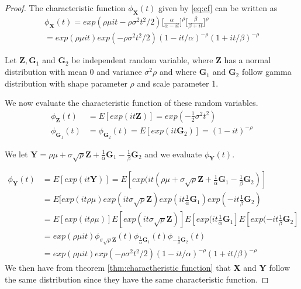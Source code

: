 \documentclass[12pt,travaildirige,nobabel, twoside]{dms}
\numberwithin{equation}{section}
\numberwithin{table}{chapter}
\numberwithin{figure}{chapter}
\begin{document}
\begin{proof}

	The characteristic function $\phi_\textbf{X}(t)$ given by \eqref{eq:cf} can be written as 
	\begin{equation}\begin{split}
	\phi_\textbf{X}(t)=exp(\rho\mu i t-\rho\sigma^2 t^2/2)\bigg[\frac{\alpha}{\alpha-it}\bigg]^\rho \bigg[\frac{\beta}{\beta +it}\bigg]^\rho\\  =exp(\rho\mu it)exp(-\rho\sigma^2 t^2/2)(1-it/\alpha)^{-\rho}(1+it/\beta)^{-\rho}\end{split}\end{equation}
	
	Let $\textbf{Z},\textbf{G}_1$ and $\textbf{G}_2$ be independent random variable, where \textbf{Z} has a normal distribution with mean 0 and variance $\sigma^2\rho$ and where $\textbf{G}_1 $ and $\textbf{G}_2$ follow gamma distribution with shape parameter $\rho$ and scale parameter 1.
	
	We now evaluate the characteristic function of these random variables.
	\begin{equation}
	\begin{aligned}
	\phi_{\textbf{Z}}(t)&=E[exp(it\textbf{Z})]=exp(-\frac{1}{2}\sigma^2t^2)\\
	\phi_{\textbf{G}_1}(t)&=\phi_{\textbf{G}_2}(t)=E[exp(it\textbf{G}_2)]=(1-it)^{-\rho}	
	\end{aligned}
	\end{equation}

	We let $ \textbf{Y}{=}\rho\mu + \sigma\sqrt{\rho}\textbf{Z}+\frac{1}{\alpha}\textbf{G}_1-\frac{1}{\beta}\textbf{G}_2 $ and we evaluate $\phi_\textbf{Y}(t)$.
	

	\begin{equation}
	\begin{aligned}
		\phi_\textbf{Y}(t)&=E[exp(it\textbf{Y})]=E[exp(it(\rho\mu + \sigma\sqrt{\rho}\textbf{Z}+\frac{1}{\alpha}\textbf{G}_1-\frac{1}{\beta}\textbf{G}_2)]\\
		&=E[exp(it\rho\mu)exp(it\sigma\sqrt{\rho}\textbf{Z})exp(it\frac{1}{\alpha}\textbf{G}_1)exp(-it\frac{1}{\beta}\textbf{G}_2)\\
		&=E[exp(it\rho\mu)]E[exp(it\sigma\sqrt{\rho}\textbf{Z})]E[exp(it\frac{1}{\alpha}\textbf{G}_1]E[exp(-it\frac{1}{\beta}\textbf{G}_2]\\
		&=exp(\rho\mu it)\phi_{\sigma\sqrt{\rho}\textbf{Z}}(t)\phi_{\frac{1}{\alpha}\textbf{G}_1}(t)\phi_{-\frac{1}{\beta}\textbf{G}_2}(t)\\
		&=exp(\rho\mu it)exp(-\rho\sigma^2 t^2/2)(1-it/\alpha)^{-\rho}(1+it/\beta)^{-\rho}
		\end{aligned}
	\end{equation}
We then have from theorem \ref{thm:charactheristic function} that \textbf{X} and \textbf{Y} follow the same distribution since they have the same characteristic function.


	\end{proof}
\end{document}
